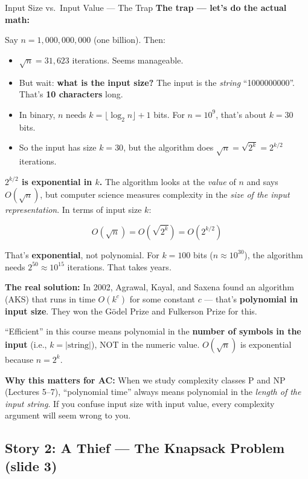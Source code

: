 \documentclass[11pt,a4paper]{article}
\newcommand{\kt}[1]{\par\vspace{0.3em}\colorbox{yellow!60}{\parbox{\dimexpr\linewidth-2\fboxsep}{#1}}\vspace{0.3em}}
\begin{document}
\begin{conceptbox}{Input Size vs.\ Input Value --- The Trap}
\textbf{The trap --- let's do the actual math:}

Say $n = 1{,}000{,}000{,}000$ (one billion). Then:
\begin{itemize}[nosep]
\item $\sqrt{n} = 31{,}623$ iterations. Seems manageable.
\item But wait: \textbf{what is the input size?} The input is the \textit{string} ``1000000000''. That's \textbf{10 characters} long.
\item In binary, $n$ needs $k = \lfloor\log_2 n\rfloor + 1$ bits. For $n = 10^9$, that's about $k = 30$ bits.
\item So the input has size $k = 30$, but the algorithm does $\sqrt{n} = \sqrt{2^k} = 2^{k/2}$ iterations.
\end{itemize}

\textbf{$2^{k/2}$ is \textbf{exponential} in $k$.} The algorithm looks at the \textit{value} of $n$ and says $O(\sqrt{n})$, but computer science measures complexity in the \textit{size of the input representation}. In terms of input size $k$:

$$O(\sqrt{n}) = O(\sqrt{2^k}) = O(2^{k/2})$$

That's \textbf{exponential}, not polynomial. For $k = 100$ bits ($n \approx 10^{30}$), the algorithm needs $2^{50} \approx 10^{15}$ iterations. That takes years.

\textbf{The real solution:} In 2002, Agrawal, Kayal, and Saxena found an algorithm (AKS) that runs in time $O(k^c)$ for some constant $c$ --- that's \textbf{polynomial in input size}. They won the G\"odel Prize and Fulkerson Prize for this.

\kt{``Efficient'' in this course means polynomial in the \textbf{number of symbols in the input} (i.e., $k = |\text{string}|$), NOT in the numeric value. $O(\sqrt{n})$ is exponential because $n = 2^k$.}
\end{conceptbox}

\textbf{Why this matters for AC:} When we study complexity classes P and NP (Lectures 5--7), ``polynomial time'' always means polynomial in the \textit{length of the input string}. If you confuse input size with input value, every complexity argument will seem wrong to you.

\subsection{Story 2: A Thief --- The Knapsack Problem (slide 3)}
\end{document}
